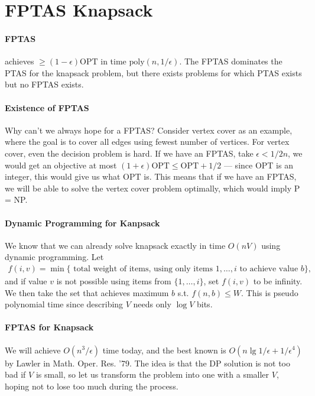 \documentclass[11pt]{article}
\newcommand{\opt}{\mathrm{OPT}}
\theoremstyle{definition}
\theoremstyle{remark}
\begin{document}
\section{FPTAS Knapsack}


\paragraph{FPTAS} achieves $\geq (1-\epsilon) \opt $ in time $\mathrm{poly}(n, 1/\epsilon)$. The FPTAS dominates the PTAS for the knapsack problem, but there exists problems for which PTAS exists but no FPTAS exists.

\paragraph{Existence of FPTAS} Why can't we always hope for a FPTAS? Consider vertex cover as an example, where the goal is to cover all edges using fewest number of vertices. For vertex cover, even the decision problem is hard. If we have an FPTAS, take $\epsilon < 1/2n$, we would get an objective at most $(1 + \epsilon) \opt \leq \opt + 1/2$ --- since OPT is an integer, this would give us what $\opt$ is. This means that if we have an FPTAS, we will be able to solve the vertex cover problem optimally, which would imply P = NP.


\paragraph{Dynamic Programming for Kanpsack} We know that we can already solve knapsack exactly in time $O(nV)$ using dynamic programming. Let
	\begin{align*}
		f(i,v) = \min \{ \text{ total weight of items, using only items } 1, \dots, i \text{ to achieve value } b \},
	\end{align*}
	and if value $v$ is not possible using items from $\{1,\dots, i\}$, set $f(i,v)$ to be infinity. We then take the set that achieves maximum $b$ s.t. $f(n,b) \leq W$. This is pseudo polynomial time since describing $V$ needs only $\log V$ bits.
	
\paragraph{FPTAS for Knapsack} 
We will achieve $O(n^3/\epsilon) $ time today, and the best known is $O(n \lg 1/\epsilon + 1/\epsilon^4)$ by Lawler in Math. Oper. Res. '79\cite{Lawler79}. The idea is that the DP solution is not too bad if $V$ is small, so let us transform the problem into one with a smaller $V$, hoping not to lose too much during the process. 
\end{document}
